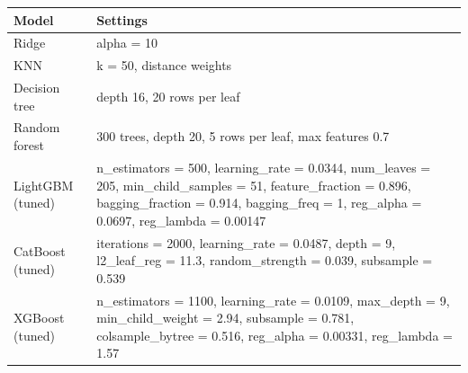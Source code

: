 \begin{tabular}{p{}p{}}
\hline
\textbf{Model} & \textbf{Settings} \\
\hline
Ridge & alpha = 10 \\
KNN & k = 50, distance weights \\
Decision tree & depth 16, 20 rows per leaf \\
Random forest & 300 trees, depth 20, 5 rows per leaf, max features 0.7 \\
LightGBM (tuned) & n\_estimators = 500, learning\_rate = 0.0344, num\_leaves = 205, min\_child\_samples = 51, feature\_fraction = 0.896, bagging\_fraction = 0.914, bagging\_freq = 1, reg\_alpha = 0.0697, reg\_lambda = 0.00147 \\
CatBoost (tuned) & iterations = 2000, learning\_rate = 0.0487, depth = 9, l2\_leaf\_reg = 11.3, random\_strength = 0.039, subsample = 0.539 \\
XGBoost (tuned) & n\_estimators = 1100, learning\_rate = 0.0109, max\_depth = 9, min\_child\_weight = 2.94, subsample = 0.781, colsample\_bytree = 0.516, reg\_alpha = 0.00331, reg\_lambda = 1.57 \\
\hline
\end{tabular}
